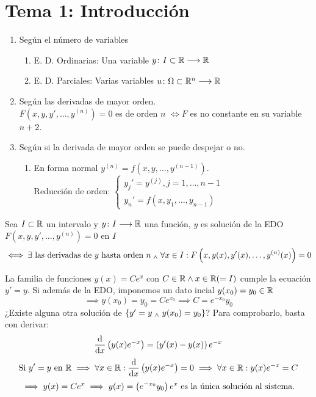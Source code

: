 \documentclass[12pt]{article}
\begin{document}
\section{Tema 1: Introducción}
\begin{defn}
    \item[] 
    \begin{enumerate}[topsep=1pt, itemsep=1pt,parsep=3pt]
        \item Según el número de variables
        \begin{enumerate}[topsep=1pt, itemsep=1pt,parsep=3pt]
            \item E. D. Ordinarias: Una variable $y \colon I\subset \mathbb{R} \longrightarrow \mathbb{R}$
            \item E. D. Parciales: Varias variables $u \colon \Omega\subset \mathbb{R}^{n} \longrightarrow \mathbb{R}$
        \end{enumerate}
        \item Según las derivadas de mayor orden. \\$F\left(x,y,y', \dots, y^{(n)}\right)=0$ es de orden $n$ \(\iff F\) es no constante en su variable $n+2$.
        \item Según si la derivada de mayor orden se puede despejar o no.
        \begin{enumerate}[topsep=1pt, itemsep=1pt,parsep=3pt]
            \item En forma normal $y^{(n)} = f(x, y, \dots, y^{(n-1)})$.
            \\ Reducción de orden:
            $\begin{cases}
                y_j' = y^{(j)}, j=1, \dots, n-1\\
                y_n'=f(x,y_1, \dots, y_{n-1})
            \end{cases}$
        \end{enumerate}
    \end{enumerate}    
\end{defn}
\begin{defn}
    Sea $I\subset \mathbb{R}$ un intervalo y $y \colon I \longrightarrow \mathbb{R}$ una función, $y$ es solución de la EDO $F\left(x,y,y', \dots, y^{(n)}\right)=0$ en $I$
    \[\iff \exists \text{ las derivadas de } y \text{ hasta orden } n \; _{\wedge} \; \forall x \in I : F\left(x,y(x),y'(x), \dots, y^{(n)}(x)\right)=0\]
\end{defn}
\begin{ejem}
    La familia de funciones $y(x)=Ce^x$ con $C\in \mathbb{R} \wedge x\in \mathbb{R} (=I)$ cumple la ecuación $y'=y$. Si además de la EDO, imponemos un dato incial $y(x_0)=y_0 \in \mathbb{R}$
    \[\implies y(x_0)=y_0=Ce^{x_0} \implies C=e^{-x_0}y_0\]
    ¿Existe alguna otra solución de $\{y'=y \; _{\wedge} \; y(x_0)=y_0\}$?
    Para comprobarlo, basta con derivar:
    \[\odv{}{x}\left(y(x)e^{-x}\right)=\left(y'(x) - y(x)\right)e^{-x}\]
    \[\tex{Si } y'=y \tex{ en } \R \implies \forall x \in \R : \odv{}{x}\left(y(x)e^{-x}\right)=0 \implies \forall x \in \R : y(x)e^{-x} = C\]
    \[\implies y(x)=Ce^x \implies y(x)=\left(e^{-x_0}y_0\right)e^x \text{ es la única solución al sistema.}\]
\end{ejem}
\end{document}
